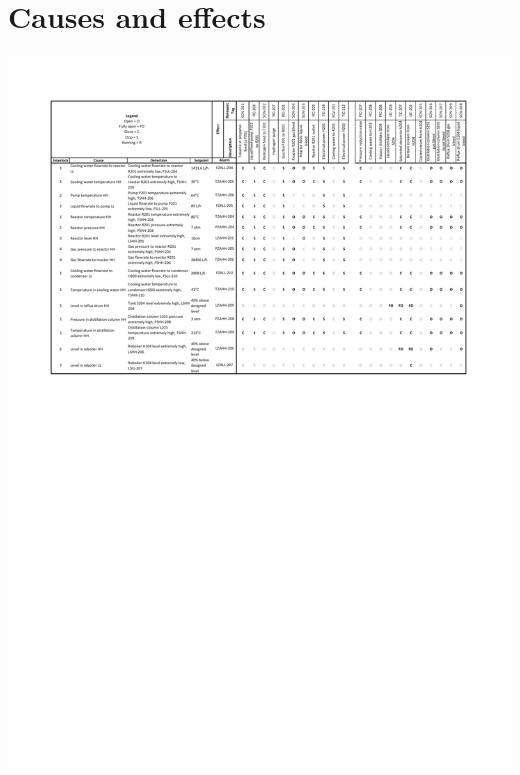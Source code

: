 \section{Causes and effects}



\begin{table}[h]
\label{tab:causeandeffects}
  \label{tbl:excel-table}
\includegraphics[clip, trim=2cm 17cm 2cm 0cm, width=\linewidth]{chapters/4-operation-control/4-Figures/Cause-and-effects.pdf}
\end{table}